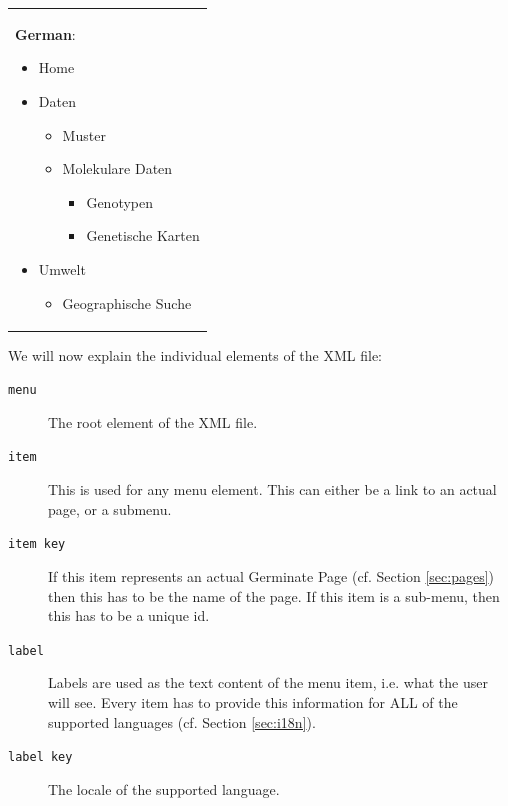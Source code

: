\begin{tabular}[t]{@{}>{\raggedright\arraybackslash}p{}}
	\textbf{German}:
	\begin{itemize}
		\item Home
		\item Daten
		\begin{itemize}
			\item Muster
			\item Molekulare Daten
			\begin{itemize}
				\item Genotypen
				\item Genetische Karten
			\end{itemize}
		\end{itemize}
		\item Umwelt
		\begin{itemize}
			\item Geographische Suche
		\end{itemize}
	\end{itemize}
\end{tabular}
\noindent
We will now explain the individual elements of the XML file:
\begin{description}
	\item[\texttt{menu}] The root element of the XML file.
	\item[\texttt{item}] This is used for any menu element. This can either be a link to an actual page, or a submenu.
	\item[\texttt{item key}] If this item represents an actual Germinate Page (cf. Section \ref{sec:pages}) then this has to be the name of the page. If this item is a sub-menu, then this has to be a unique id.
	\item[\texttt{label}] Labels are used as the text content of the menu item, i.e. what the user will see. Every item has to provide this information for ALL of the supported languages (cf. Section \ref{sec:i18n}).
	\item[\texttt{label key}] The locale of the supported language.
\end{description}